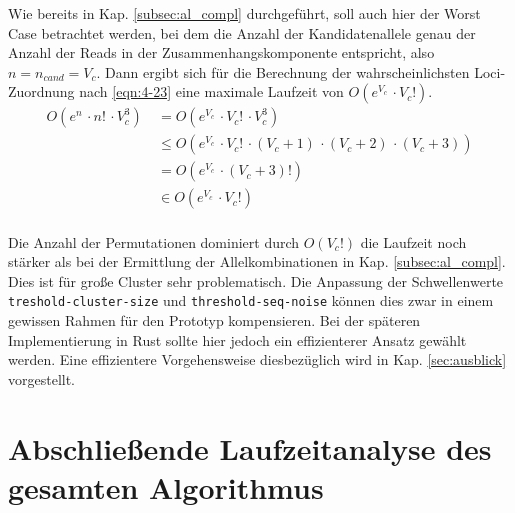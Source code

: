 Wie bereits in Kap. \ref{subsec:al_compl} durchgeführt, soll auch hier der Worst Case betrachtet werden, bei dem die Anzahl der Kandidatenallele genau der Anzahl der Reads in der Zusammenhangskomponente entspricht, also $ n = n_{cand} =V_{c} $. Dann ergibt sich für die Berechnung der wahrscheinlichsten Loci-Zuordnung nach \eqref{eqn:4-23} eine maximale Laufzeit von $ O(e^{V_{c}} \, \cdotp V_{c}!) $.
\begin{equation} \label{eqn:4-23}
\tag{4-23}
\begin{aligned}
O(e^n \, \cdotp n! \, \cdotp V_{c}^3)
&\ {}=O(e^{V_{c}} \, \cdotp V_{c}! \, \cdotp V_{c}^3)\\
&\ \leq O(e^{V_{c}} \, \cdotp V_{c}! \, \cdotp (V_{c} + 1)\, \cdotp (V_{c} + 2)\, \cdotp (V_{c} + 3))\\
&\ =  O(e^{V_{c}} \, \cdotp (V_{c} + 3)!)\\
&\ \in O(e^{V_{c}} \, \cdotp V_{c}!)\\
\end{aligned}
\end{equation}

Die Anzahl der Permutationen dominiert durch $ O(V_{c}!) $ die Laufzeit noch stärker als bei der Ermittlung der Allelkombinationen in Kap. \ref{subsec:al_compl}. Dies ist für große Cluster sehr problematisch. Die Anpassung der Schwellenwerte \lstinline|treshold-cluster-size| und \linebreak \lstinline|threshold-seq-noise| können dies zwar in einem gewissen Rahmen für den Prototyp kompensieren. Bei der späteren Implementierung in Rust sollte hier jedoch ein effizienterer Ansatz gewählt werden. Eine effizientere Vorgehensweise diesbezüglich wird in Kap. \ref{sec:ausblick} vorgestellt.

\section{Abschließende Laufzeitanalyse des gesamten Algorithmus}

